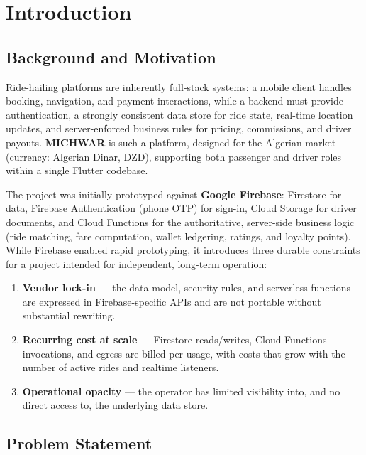 \documentclass[11pt,a4paper]{article}
\begin{document}
\section{Introduction}

\subsection{Background and Motivation}

Ride-hailing platforms are inherently full-stack systems: a mobile client
handles booking, navigation, and payment interactions, while a backend must
provide authentication, a strongly consistent data store for ride state,
real-time location updates, and server-enforced business rules for pricing,
commissions, and driver payouts. \textbf{MICHWAR} is such a platform,
designed for the Algerian market (currency: Algerian Dinar, DZD), supporting
both passenger and driver roles within a single Flutter codebase.

The project was initially prototyped against \textbf{Google Firebase}:
Firestore for data, Firebase Authentication (phone OTP) for sign-in, Cloud
Storage for driver documents, and Cloud Functions for the authoritative,
server-side business logic (ride matching, fare computation, wallet
ledgering, ratings, and loyalty points). While Firebase enabled rapid
prototyping, it introduces three durable constraints for a project intended
for independent, long-term operation:

\begin{enumerate}[nosep]
  \item \textbf{Vendor lock-in} --- the data model, security rules, and
    serverless functions are expressed in Firebase-specific APIs and are not
    portable without substantial rewriting.
  \item \textbf{Recurring cost at scale} --- Firestore reads/writes, Cloud
    Functions invocations, and egress are billed per-usage, with costs that
    grow with the number of active rides and realtime listeners.
  \item \textbf{Operational opacity} --- the operator has limited visibility
    into, and no direct access to, the underlying data store.
  \end{enumerate}

\subsection{Problem Statement}
\end{document}
